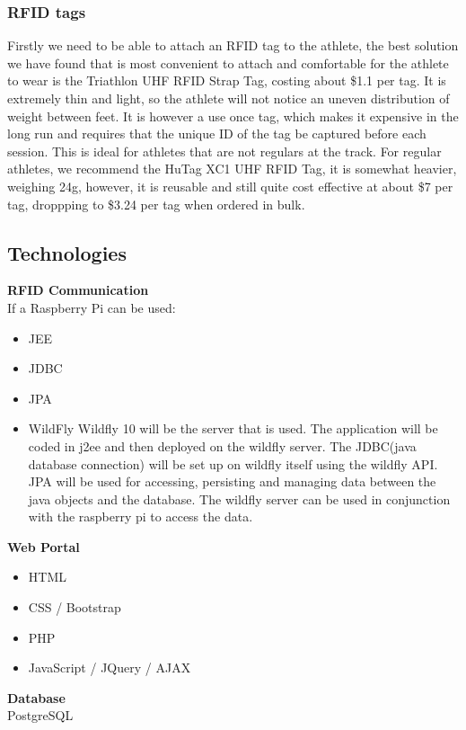 \documentclass{article}
\begin{document}
\subsubsection{RFID tags}
Firstly we need to be able to attach an RFID tag to the athlete, the best solution we have found that is most convenient to attach and comfortable for the athlete to wear is the Triathlon UHF RFID Strap Tag, costing about \$1.1 per tag. It is extremely thin and light, so the athlete will not notice an uneven distribution of weight between feet. It is however a use once tag, which makes it expensive in the long run and requires that the unique ID of the tag be captured before each session. This is ideal for athletes that are not regulars at the track. For regular athletes, we recommend the HuTag XC1 UHF RFID Tag, it is somewhat heavier, weighing 24g, however, it is reusable and still quite cost effective at about \$7 per tag, droppping to \$3.24 per tag when ordered in bulk.


\subsection{Technologies}
\textbf{RFID Communication} \\
If a Raspberry Pi can be used:  
\begin{itemize}
	\item JEE
	\item JDBC
	\item JPA
	\item WildFly
Wildfly 10 will be the server that is used. The application will be coded in j2ee and then deployed on the wildfly server. The JDBC(java database connection) will be set up on wildfly itself using the wildfly API. JPA will be used for accessing, persisting and managing data between the java objects and the database. The wildfly server can be used in conjunction with  the raspberry pi to access the data. 
\end{itemize}
\textbf{Web Portal} 
\begin{itemize}
	\item HTML
	\item CSS / Bootstrap
	\item PHP
	\item JavaScript / JQuery / AJAX
\end{itemize}
\textbf{Database} \\
PostgreSQL
\end{document}
